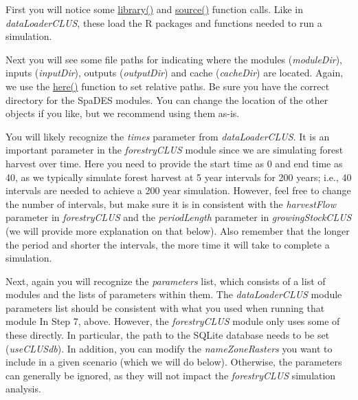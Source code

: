 \documentclass[
]{article}
\begin{document}
First you will notice some
\href{https://www.rdocumentation.org/packages/base/versions/3.6.2/topics/library}{library()}
and
\href{https://www.rdocumentation.org/packages/base/versions/3.6.2/topics/source}{source()}
function calls. Like in \emph{dataLoaderCLUS}, these load the R packages
and functions needed to run a simulation.

Next you will see some file paths for indicating where the modules
(\emph{moduleDir}), inputs (\emph{inputDir}), outputs (\emph{outputDir})
and cache (\emph{cacheDir}) are located. Again, we use the
\href{https://www.rdocumentation.org/packages/here/versions/0.1}{here()}
function to set relative paths. Be sure you have the correct directory
for the SpaDES modules. You can change the location of the other objects
if you like, but we recommend using them as-is.

You will likely recognize the \emph{times} parameter from
\emph{dataLoaderCLUS}. It is an important parameter in the
\emph{forestryCLUS} module since we are simulating forest harvest over
time. Here you need to provide the start time as 0 and end time as 40,
as we typically simulate forest harvest at 5 year intervals for 200
years; i.e., 40 intervals are needed to achieve a 200 year simulation.
However, feel free to change the number of intervals, but make sure it
is in consistent with the \emph{harvestFlow} parameter in
\emph{forestryCLUS} and the \emph{periodLength} parameter in
\emph{growingStockCLUS} (we will provide more explanation on that
below). Also remember that the longer the period and shorter the
intervals, the more time it will take to complete a simulation.

Next, again you will recognize the \emph{parameters} list, which
consists of a list of modules and the lists of parameters within them.
The \emph{dataLoaderCLUS} module parameters list should be consistent
with what you used when running that module In Step 7, above. However,
the \emph{forestryCLUS} module only uses some of these directly. In
particular, the path to the SQLite database needs to be set
(\emph{useCLUSdb}). In addition, you can modify the
\emph{nameZoneRasters} you want to include in a given scenario (which we
will do below). Otherwise, the parameters can generally be ignored, as
they will not impact the \emph{forestryCLUS} simulation analysis.
\end{document}
